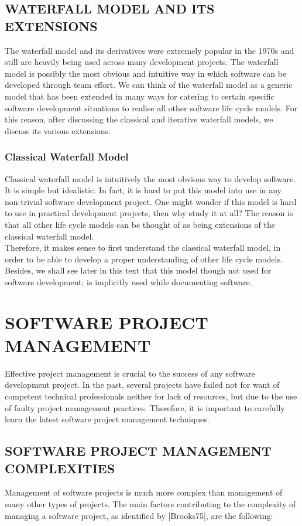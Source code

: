 \documentclass[12pt]{article}
\begin{document}
\subsection{WATERFALL MODEL AND ITS EXTENSIONS}
The waterfall model and its derivatives were extremely popular in the
1970s and still are heavily being used across many development
projects. The waterfall model is possibly the most obvious and intuitive
way in which software can be developed through team effort. We can
think of the waterfall model as a generic model that has been extended
in many ways for catering to certain specific software development
situations to realise all other software life cycle models. For this reason,
after discussing the classical and iterative waterfall models, we discuss
its various extensions.
\subsubsection{Classical Waterfall Model}
Classical waterfall model is intuitively the most obvious way to develop
software. It is simple but idealistic. In fact, it is hard to put this model
into use in any non-trivial software development project. One might
wonder if this model is hard to use in practical development projects,
then why study it at all? The reason is that all other life cycle models
can be thought of as being extensions of the classical waterfall model.\\

Therefore, it makes sense to first understand the classical waterfall
model, in order to be able to develop a proper understanding of other
life cycle models. Besides, we shall see later in this text that this model
though not used for software development; is implicitly used while
documenting software.
\pagebreak

\section{SOFTWARE PROJECT MANAGEMENT}
Effective project management is crucial to the success of any software
development project. In the past, several projects have failed not for
want of competent technical professionals neither for lack of resources,
but due to the use of faulty project management practices. Therefore, it
is important to carefully learn the latest software project management
techniques.
\subsection{ SOFTWARE PROJECT MANAGEMENT COMPLEXITIES}
Management of software projects is much more complex than
management of many other types of projects. The main factors
contributing to the complexity of managing a software project, as
identified by [Brooks75], are the following:
\end{document}
